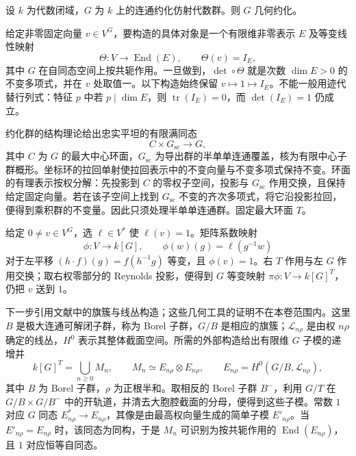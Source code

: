 \begin{theorem}[Haboush 定理]\label{b5:thm:haboush-geometric-reductivity}
	设 \(k\) 为代数闭域，\(G\) 为 \(k\) 上的连通约化仿射代数群。则 \(G\) 几何约化。
\end{theorem}
\begin{proofsketch}
	给定非零固定向量 \(v\in V^G\)，要构造的具体对象是一个有限维非零表示 \(E\) 及等变线性映射
	\[
		\Theta:V\longrightarrow\operatorname{End}(E),\qquad \Theta(v)=I_E,
	\]
	其中 \(G\) 在自同态空间上按共轭作用。一旦做到，\(\det\circ\Theta\) 就是次数 \(\dim E>0\) 的不变多项式，并在 \(v\) 处取值一。以下构造始终保留 \(v\mapsto1\mapsto I_E\)。不能一般用迹代替行列式：特征 \(p\) 中若 \(p\mid\dim E\)，则 \(\operatorname{tr}(I_E)=0\)，而 \(\det(I_E)=1\) 仍成立。

	约化群的结构理论给出忠实平坦的有限满同态
	\[
		C\times G_{\mathrm{sc}}\longrightarrow G,
	\]
	其中 \(C\) 为 \(G\) 的最大中心环面，\(G_{\mathrm{sc}}\) 为导出群的半单单连通覆盖，核为有限中心子群概形。坐标环的拉回单射使拉回表示中的不变向量与不变多项式保持不变。环面的有理表示按权分解：先投影到 \(C\) 的零权子空间，投影与 \(G_{\mathrm{sc}}\) 作用交换，且保持给定固定向量。若在该子空间上找到 \(G_{\mathrm{sc}}\) 不变的齐次多项式，将它沿投影拉回，便得到乘积群的不变量。因此只须处理半单单连通群。固定最大环面 \(T\)。

	给定 \(0\ne v\in V^G\)，选 \(\ell\in V^*\) 使 \(\ell(v)=1\)。矩阵系数映射
	\[
		\phi:V\longrightarrow k[G],\qquad \phi(w)(g)=\ell(g^{-1}w)
	\]
	对于左平移 \((h\cdot f)(g)=f(h^{-1}g)\) 等变，且 \(\phi(v)=1\)。右 \(T\) 作用与左 \(G\) 作用交换；取右权零部分的 Reynolds 投影，便得到 \(G\) 等变映射 \(\pi\phi:V\to k[G]^T\)，仍把 \(v\) 送到 \(1\)。

	下一步引用文献中的旗簇与线丛构造；这些几何工具的证明不在本卷范围内。这里 \(B\) 是极大连通可解闭子群，称为 Borel 子群，\(G/B\) 是相应的旗簇；\(\mathcal L_{n\rho}\) 是由权 \(n\rho\) 确定的线丛，\(H^0\) 表示其整体截面空间。所需的外部构造给出有限维 \(G\) 子模的递增并
	\[
		k[G]^T=\bigcup_{n\ge0}M_n,\qquad M_n\simeq E_{n\rho}\otimes E_{n\rho},\qquad E_{n\rho}=H^0(G/B,\mathcal L_{n\rho}),
	\]
	其中 \(B\) 为 Borel 子群，\(\rho\) 为正根半和。取相反的 Borel 子群 \(B^-\)，利用 \(G/T\) 在 \(G/B\times G/B^-\) 中的开轨道，并清去大胞腔截面的分母，便得到这些子模。常数 \(1\) 对应 \(G\) 同态 \(E_{n\rho}^*\to E_{n\rho}\)，其像是由最高权向量生成的简单子模 \(E'_{n\rho}\)。当 \(E'_{n\rho}=E_{n\rho}\) 时，该同态为同构，于是 \(M_n\) 可识别为按共轭作用的 \(\operatorname{End}(E_{n\rho})\)，且 \(1\) 对应恒等自同态。


\end{proofsketch}
